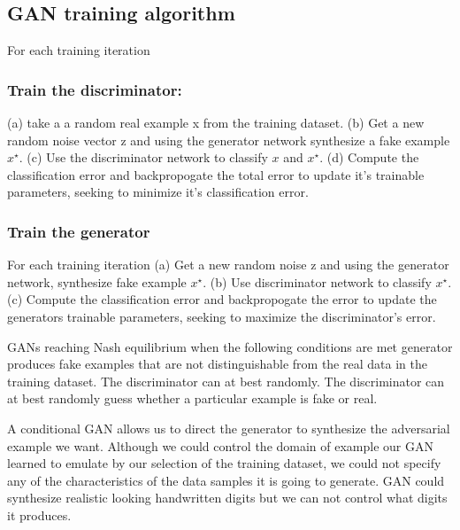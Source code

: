 \subsection{GAN training algorithm}

For each training iteration
\subsubsection{Train the discriminator:}
(a) take a a random real example x from the training dataset. (b) Get a new random noise vector z and using the generator network synthesize a fake example  $x^{\star}$. (c) Use the discriminator network to classify  $x$ and  $x^{\star}$. (d) Compute the classification error and backpropogate the total error to update it's trainable parameters, seeking to minimize it's classification error. 

\subsubsection{Train the generator}
For each training iteration
(a) Get a new random noise z and using the generator network, synthesize fake example $x^{\star}$. (b) Use discriminator network to classify $x^{\star}$. (c) Compute the classification error and backpropogate the error to update the generators trainable parameters, seeking to maximize the discriminator's error. 

GANs reaching Nash equilibrium when the following conditions are met generator produces fake examples that are not distinguishable from the real data in the training dataset. The discriminator can at best randomly. The discriminator can at best randomly guess whether a particular example is fake or real.  

A conditional GAN allows us to direct the generator to synthesize the adversarial example we want. Although we could control the domain of example our GAN learned to emulate by our selection of the training dataset, we could not specify any of the characteristics of the data samples it is going to generate. GAN could synthesize realistic looking handwritten digits but we can not control what digits it produces. 